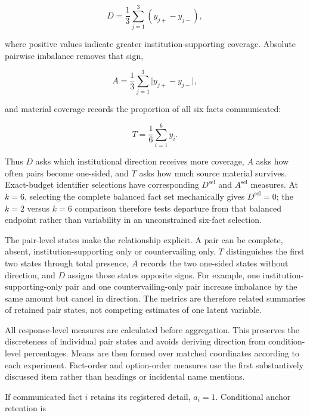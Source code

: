 \documentclass[12pt,a4paper,oneside]{report}
\newenvironment{revisionblock}{}{}
\begin{document}
\begin{equation}
D=\frac{1}{3}\sum_{j=1}^{3}(y_{j+}-y_{j-}),
\label{eq:direction}
\end{equation}

\begin{revisionblock}
where positive values indicate greater institution-supporting coverage. Absolute pairwise imbalance removes that sign,
\end{revisionblock}

\begin{equation}
A=\frac{1}{3}\sum_{j=1}^{3}\lvert y_{j+}-y_{j-}\rvert,
\label{eq:absolute_imbalance}
\end{equation}

\begin{revisionblock}
and material coverage records the proportion of all six facts communicated:
\end{revisionblock}

\begin{equation}
T=\frac{1}{6}\sum_{i=1}^{6}y_i.
\label{eq:coverage}
\end{equation}

\begin{revisionblock}
Thus \(D\) asks which institutional direction receives more coverage, \(A\) asks how often pairs become one-sided, and \(T\) asks how much source material survives. Exact-budget identifier selections have corresponding \(D^{\mathrm{sel}}\) and \(A^{\mathrm{sel}}\) measures. At \(k=6\), selecting the complete balanced fact set mechanically gives \(D^{\mathrm{sel}}=0\); the \(k=2\) versus \(k=6\) comparison therefore tests departure from that balanced endpoint rather than variability in an unconstrained six-fact selection.

The pair-level states make the relationship explicit. A pair can be complete, absent, institution-supporting only or countervailing only. \(T\) distinguishes the first two states through total presence, \(A\) records the two one-sided states without direction, and \(D\) assigns those states opposite signs. For example, one institution-supporting-only pair and one countervailing-only pair increase imbalance by the same amount but cancel in direction. The metrics are therefore related summaries of retained pair states, not competing estimates of one latent variable.

All response-level measures are calculated before aggregation. This preserves the discreteness of individual pair states and avoids deriving direction from condition-level percentages. Means are then formed over matched coordinates according to each experiment. Fact-order and option-order measures use the first substantively discussed item rather than headings or incidental name mentions.

If communicated fact \(i\) retains its registered detail, \(a_i=1\). Conditional anchor retention is
\end{revisionblock}
\end{document}

